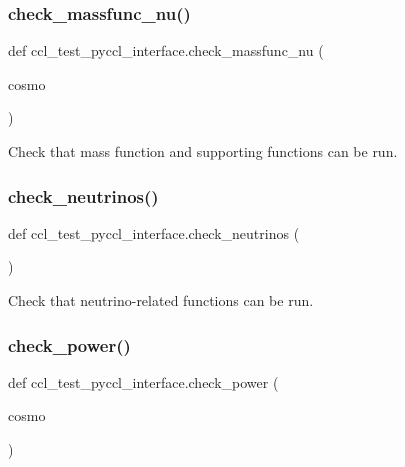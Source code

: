 \subsubsection{\texorpdfstring{check\+\_\+massfunc\+\_\+nu()}{check\_massfunc\_nu()}}
{\footnotesize\ttfamily def ccl\+\_\+test\+\_\+pyccl\+\_\+interface.\+check\+\_\+massfunc\+\_\+nu (\begin{DoxyParamCaption}\item[{}]{cosmo }\end{DoxyParamCaption})}

\begin{DoxyVerb}Check that mass function and supporting functions can be run.
\end{DoxyVerb}
 \mbox{\label{namespaceccl__test__pyccl__interface_a45d1e6f91fd168f5b48149bfdfa6aa8b}} 
\subsubsection{\texorpdfstring{check\+\_\+neutrinos()}{check\_neutrinos()}}
{\footnotesize\ttfamily def ccl\+\_\+test\+\_\+pyccl\+\_\+interface.\+check\+\_\+neutrinos (\begin{DoxyParamCaption}{ }\end{DoxyParamCaption})}

\begin{DoxyVerb}Check that neutrino-related functions can be run.
\end{DoxyVerb}
 \mbox{\label{namespaceccl__test__pyccl__interface_a0e14d8cd4b51c38207fa38e5ca127e38}} 
\subsubsection{\texorpdfstring{check\+\_\+power()}{check\_power()}}
{\footnotesize\ttfamily def ccl\+\_\+test\+\_\+pyccl\+\_\+interface.\+check\+\_\+power (\begin{DoxyParamCaption}\item[{}]{cosmo }\end{DoxyParamCaption})}

